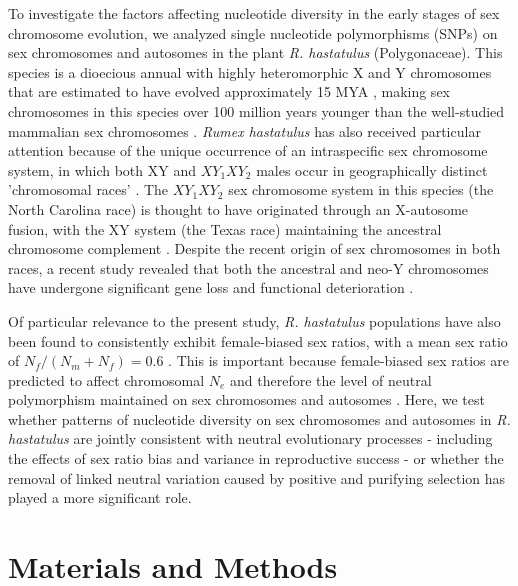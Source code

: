 \documentclass[9pt,twocolumn,twoside]{gsajnl}
\begin{document}
To investigate the factors affecting nucleotide diversity in the early stages of sex chromosome evolution, we analyzed single nucleotide polymorphisms (SNPs) on sex chromosomes and autosomes in the plant \textit{R. hastatulus }(Polygonaceae). This species is a dioecious annual with highly heteromorphic X and Y chromosomes that are estimated to have evolved  approximately 15 MYA \citep{quesada2011,grabowska2015,navajas2005}, making sex chromosomes in this species over 100 million years younger than the well-studied mammalian sex chromosomes \citep{lahn1999,ross2005dna}. \textit{Rumex hastatulus} has also received particular attention because of the unique occurrence of an intraspecific sex chromosome system, in which both XY and $XY_{1}XY_{2}$ males occur in geographically distinct 'chromosomal races' \citep{smith1963mechanism}. The $XY_{1}XY_{2}$ sex chromosome system in this species (the North Carolina race) is thought to have originated through an X-autosome fusion, with the XY system (the Texas race) maintaining the ancestral chromosome complement \citep{smith1964evolving}. Despite the recent origin of sex chromosomes in both races, a recent study revealed that both the ancestral and neo-Y chromosomes have undergone significant gene loss and functional deterioration \citep{hough2014}.

Of particular relevance to the present study, \textit{R. hastatulus} populations have also been found to consistently exhibit female-biased sex ratios, with a mean sex ratio of $N_{f}/(N_{m}+N_{f})=0.6$ \citep{pickup2013influence}. This is important because female-biased sex ratios are predicted to affect chromosomal $N_{e}$ and therefore the level of neutral polymorphism maintained on sex chromosomes and autosomes \citep{ellegren2009}. Here, we test whether patterns of nucleotide diversity on sex chromosomes and autosomes in \textit{R. hastatulus} are jointly consistent with neutral evolutionary processes - including the effects of sex ratio bias and variance in reproductive success - or whether the removal of linked neutral variation caused by positive and purifying selection has played a more significant role.

\section*{Materials and Methods}
\end{document}
